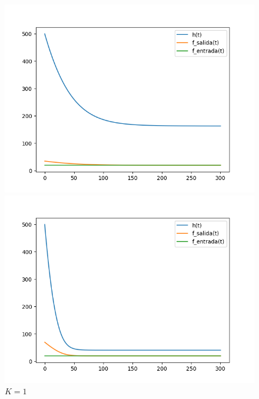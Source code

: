 \documentclass[12pt]{article}
\begin{document}
\begin{figure}[h]
	\begin{minipage}{0.32\textwidth}
		\centering
		\includegraphics[width=\linewidth]{c20k05}
		\caption{$K = 0.5$}
		\label{gr:c20k0.5}
	\end{minipage}
	\begin{minipage}{0.32\textwidth}
		\centering
		\includegraphics[width=\linewidth]{c20k1}
		\caption{$K = 1$}
		\label{gr:c20k1}
	\end{minipage}
	\begin{minipage}{0.32\textwidth}
		\centering

\end{minipage}
\end{figure}
\end{document}
